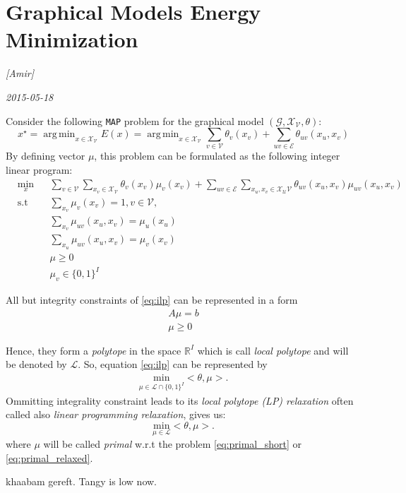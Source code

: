 \documentclass[12pt, pdftex]{article}
\DeclareMathOperator*{\argmin}{arg\,min}
\begin{document}
\section*{Graphical Models Energy Minimization}
\noindent
\textsl{[Amir]}

\noindent
\textsl{2015-05-18}

Consider the following \texttt{MAP} problem for the graphical model
$(\mathcal{G},\mathcal{X_V},\theta)$:
\begin{equation}
x^{\star}=\argmin_{x\in\mathcal{X_V}} E(x) = \argmin_{x\in\mathcal{X_V}}
\sum_{v\in\mathcal{V}} \theta_v(x_v) + \sum_{uv \in \mathcal{E}}
\theta_{uv}(x_u,x_v)
\end{equation}
By defining vector $\mu$, this problem can be formulated as the following integer linear
program:
\begin{equation}
\label{eq:ilp}
\begin{aligned}
& \underset{x}{\text{min}}
& & \sum_{v\in\mathcal{V}} \sum_{x_v \in \mathcal{X_V}} \theta_v(x_v)\mu_v(x_v)
+ \sum_{uv\in\mathcal{E}} \sum_{x_u,x_v \in \mathcal{X_UV}} \theta_{uv}(x_u,x_v)
\mu_{uv}(x_u,x_v)\\
& \text{s.t}
& & \sum_{x_v} \mu_v(x_v) = 1, v\in\mathcal{V},\\
&&& \sum_{x_v} \mu_{uv}(x_u, x_v) = \mu_u(x_u) \\
&&& \sum_{x_u} \mu_{uv}(x_u, x_v) = \mu_v(x_v) \\
&&& \mu \geq 0 \\
&&& \mu_v \in \{0,1\}^I
\end{aligned}
\end{equation}

All but integrity constraints of \ref{eq:ilp} can be represented in a form
\begin{equation}
\begin{aligned}
A\mu = b \\
\mu \geq 0
\end{aligned}
\end{equation}

Hence, they form a \textit{polytope} in the space $\mathbb{R}^I$ which is call
\textit{local polytope} and will be denoted by $\mathcal{L}$. So, equation
\ref{eq:ilp} can be represented by
\begin{equation}
\label{eq:primal_short}
\begin{aligned}
\underset{\mu \in \mathcal{L} \cap \{0,1\}^I}{\text{min}} <\theta,\mu> .
\end{aligned}
\end{equation}
Ommitting integrality constraint leads to its \textit{local polytope (LP)
relaxation} often called also \textit{linear programming relaxation}, gives us:
\begin{equation}
\label{eq:primal_relaxed}
\underset{\mu \in \mathcal{L}}{\text{min}} <\theta,\mu> .
\end{equation}
where $\mu$ will be called \textit{primal} w.r.t the problem
\ref{eq:primal_short} or \ref{eq:primal_relaxed}.

khaabam gereft. Tangy is low now.
\end{document}
